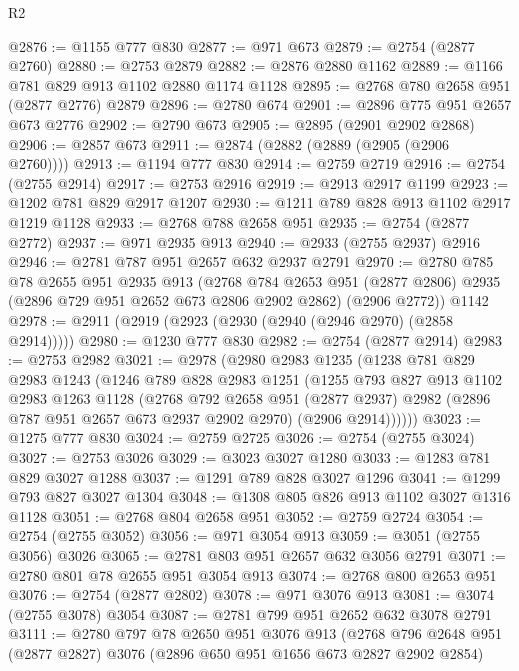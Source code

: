 \begin{lexlean}{R2}
\begin{coremodule}
@2876 := @1155 @777 @830
@2877 := @971 @673
@2879 := @2754 (@2877 @2760)
@2880 := @2753 @2879
@2882 := @2876 @2880 @1162
@2889 := @1166 @781 @829 @913 @1102 @2880 @1174 @1128
@2895 := @2768 @780 @2658 @951 (@2877 @2776) @2879
@2896 := @2780 @674
@2901 := @2896 @775 @951 @2657 @673 @2776
@2902 := @2790 @673
@2905 := @2895 (@2901 @2902 @2868)
@2906 := @2857 @673
@2911 := @2874 (@2882 (@2889 (@2905 (@2906 @2760))))
@2913 := @1194 @777 @830
@2914 := @2759 @2719
@2916 := @2754 (@2755 @2914)
@2917 := @2753 @2916
@2919 := @2913 @2917 @1199
@2923 := @1202 @781 @829 @2917 @1207
@2930 := @1211 @789 @828 @913 @1102 @2917 @1219 @1128
@2933 := @2768 @788 @2658 @951
@2935 := @2754 (@2877 @2772)
@2937 := @971 @2935 @913
@2940 := @2933 (@2755 @2937) @2916
@2946 := @2781 @787 @951 @2657 @632 @2937 @2791
@2970 := @2780
    @785
    @78
    @2655
    @951
    @2935
    @913
    (@2768
      @784
      @2653
      @951
      (@2877 @2806)
      @2935
      (@2896 @729 @951 @2652 @673 @2806 @2902 @2862)
      (@2906 @2772))
    @1142
@2978 := @2911 (@2919 (@2923 (@2930 (@2940 (@2946 @2970) (@2858 @2914)))))
@2980 := @1230 @777 @830
@2982 := @2754 (@2877 @2914)
@2983 := @2753 @2982
@3021 := @2978
    (@2980
      @2983
      @1235
      (@1238
        @781
        @829
        @2983
        @1243
        (@1246
          @789
          @828
          @2983
          @1251
          (@1255
            @793
            @827
            @913
            @1102
            @2983
            @1263
            @1128
            (@2768
              @792
              @2658
              @951
              (@2877 @2937)
              @2982
              (@2896 @787 @951 @2657 @673 @2937 @2902 @2970)
              (@2906 @2914))))))
@3023 := @1275 @777 @830
@3024 := @2759 @2725
@3026 := @2754 (@2755 @3024)
@3027 := @2753 @3026
@3029 := @3023 @3027 @1280
@3033 := @1283 @781 @829 @3027 @1288
@3037 := @1291 @789 @828 @3027 @1296
@3041 := @1299 @793 @827 @3027 @1304
@3048 := @1308 @805 @826 @913 @1102 @3027 @1316 @1128
@3051 := @2768 @804 @2658 @951
@3052 := @2759 @2724
@3054 := @2754 (@2755 @3052)
@3056 := @971 @3054 @913
@3059 := @3051 (@2755 @3056) @3026
@3065 := @2781 @803 @951 @2657 @632 @3056 @2791
@3071 := @2780 @801 @78 @2655 @951 @3054 @913
@3074 := @2768 @800 @2653 @951
@3076 := @2754 (@2877 @2802)
@3078 := @971 @3076 @913
@3081 := @3074 (@2755 @3078) @3054
@3087 := @2781 @799 @951 @2652 @632 @3078 @2791
@3111 := @2780
    @797
    @78
    @2650
    @951
    @3076
    @913
    (@2768
      @796
      @2648
      @951
      (@2877 @2827)
      @3076
      (@2896 @650 @951 @1656 @673 @2827 @2902 @2854)

\end{coremodule}
\end{lexlean}
